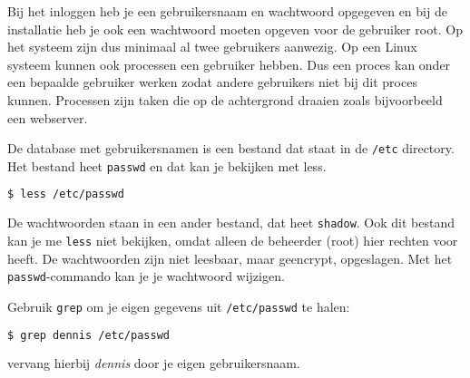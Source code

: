 Bij het inloggen heb je een gebruikersnaam en wachtwoord opgegeven en bij de installatie heb je ook een wachtwoord moeten opgeven voor de gebruiker root. Op het systeem zijn dus minimaal al twee gebruikers aanwezig. Op een Linux systeem kunnen ook processen een gebruiker hebben. Dus een proces kan onder een bepaalde gebruiker werken zodat andere gebruikers niet bij dit proces kunnen. Processen zijn taken die op de achtergrond draaien zoals bijvoorbeeld een webserver.

De database met gebruikersnamen is een bestand dat staat in de \texttt{/etc} directory. Het bestand heet \texttt{passwd} en dat kan je bekijken met less.

\begin{lstlisting}[language=bash]
$ less /etc/passwd
\end{lstlisting}

De wachtwoorden staan in een ander bestand, dat heet \texttt{shadow}. Ook dit bestand kan je me \texttt{less} niet bekijken, omdat alleen de beheerder (root) hier rechten voor heeft. De wachtwoorden zijn niet leesbaar, maar geencrypt, opgeslagen. Met het \texttt{passwd}-commando kan je je wachtwoord wijzigen.

Gebruik \texttt{grep} om je eigen gegevens uit \texttt{/etc/passwd} te halen:
\begin{lstlisting}[language=bash]
$ grep dennis /etc/passwd
\end{lstlisting}
vervang hierbij \textsl{dennis} door je eigen gebruikersnaam.

